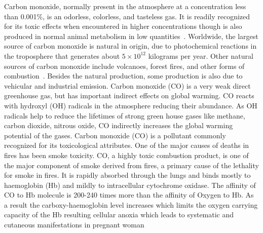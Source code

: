Carbon monoxide, normally present in the atmosphere at a concentration less
than 0.001\%, is an odorless, colorless, and tasteless gas. It is readily recognized
for its toxic effects when encountered in higher concentrations though is also
produced in normal animal metabolism in low quantities~\citep{palali1997skin}.
Worldwide, the largest source of carbon monoxide is natural in origin, due to
photochemical reactions in the troposphere that generates about $5 \times 10^{12}$ kilograms per year. Other natural sources of carbon monoxide include volcanoes,
forest fires, and other forms of combustion~\citep{thompson2009carbon}. Besides the natural production,
some production is also due to vehicular and industrial emission.
Carbon monoxide (CO) is a very weak direct greenhouse gas, but has important
indirect effects on global warming. CO reacts with hydroxyl (OH) radicals in the atmosphere reducing their abundance. As OH radicals help to reduce the lifetimes of strong green house gases like methane, carbon dioxide, nitrous oxide, CO indirectly increases the global warming potential of the gases.
Carbon monoxide (CO) is a pollutant commonly recognized for its toxicological
attributes. One of the major causes of deaths in fires has been smoke toxicity. CO, a highly toxic combustion product, is one of the major component of smoke derived from fires, a primary cause of the lethality for smoke in fires. It is rapidly absorbed through the lungs and binds mostly to haemoglobin (Hb) and mildly to intracellular cytochrome oxidase. The affinity of CO to Hb molecule is
200-240 times more than the affinity of Oxygen to Hb. As a result the carboxy-haemoglobin level increases which limits the oxygen carrying capacity of the Hb
resulting cellular anoxia which leads to systematic and cutaneous manifestations
in pregnant woman~\citep{palali1997skin} 


